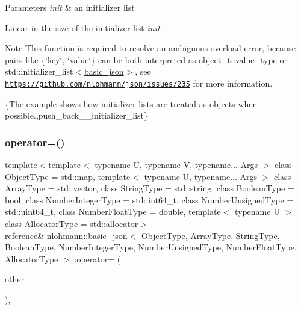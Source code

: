 \begin{DoxyParams}{Parameters}
{\em init} & an initializer list\\
\hline
\end{DoxyParams}
Linear in the size of the initializer list {\itshape init}.

\begin{DoxyNote}{Note}
This function is required to resolve an ambiguous overload error, because pairs like {\ttfamily \{\char`\"{}key\char`\"{}, \char`\"{}value\char`\"{}\}} can be both interpreted as {\ttfamily object\+\_\+t\+::value\+\_\+type} or {\ttfamily std\+::initializer\+\_\+list$<$\hyperlink{classnlohmann_1_1basic__json}{basic\+\_\+json}$>$}, see \href{https://github.com/nlohmann/json/issues/235}{\tt https\+://github.\+com/nlohmann/json/issues/235} for more information.
\end{DoxyNote}
\{The example shows how initializer lists are treated as objects when possible.,push\+\_\+back\+\_\+\+\_\+initializer\+\_\+list\} \hypertarget{classnlohmann_1_1basic__json_ae08fa64b9f0a5b5c878cbbabb7a296ee}{}\label{classnlohmann_1_1basic__json_ae08fa64b9f0a5b5c878cbbabb7a296ee} 
\subsubsection{\texorpdfstring{operator=()}{operator=()}}
{\footnotesize\ttfamily template$<$template$<$ typename U, typename V, typename... Args $>$ class Object\+Type = std\+::map, template$<$ typename U, typename... Args $>$ class Array\+Type = std\+::vector, class String\+Type  = std\+::string, class Boolean\+Type  = bool, class Number\+Integer\+Type  = std\+::int64\+\_\+t, class Number\+Unsigned\+Type  = std\+::uint64\+\_\+t, class Number\+Float\+Type  = double, template$<$ typename U $>$ class Allocator\+Type = std\+::allocator$>$ \\
\hyperlink{classnlohmann_1_1basic__json_a3ec8e17be8732fe436e9d6733f52b7a3}{reference}\& \hyperlink{classnlohmann_1_1basic__json}{nlohmann\+::basic\+\_\+json}$<$ Object\+Type, Array\+Type, String\+Type, Boolean\+Type, Number\+Integer\+Type, Number\+Unsigned\+Type, Number\+Float\+Type, Allocator\+Type $>$\+::operator= (\begin{DoxyParamCaption}\item[{\hyperlink{classnlohmann_1_1basic__json}{basic\+\_\+json}$<$ Object\+Type, Array\+Type, String\+Type, Boolean\+Type, Number\+Integer\+Type, Number\+Unsigned\+Type, Number\+Float\+Type, Allocator\+Type $>$}]{other }\end{DoxyParamCaption})\hspace{0.3cm}{\ttfamily [inline]}, {\ttfamily [noexcept]}}



